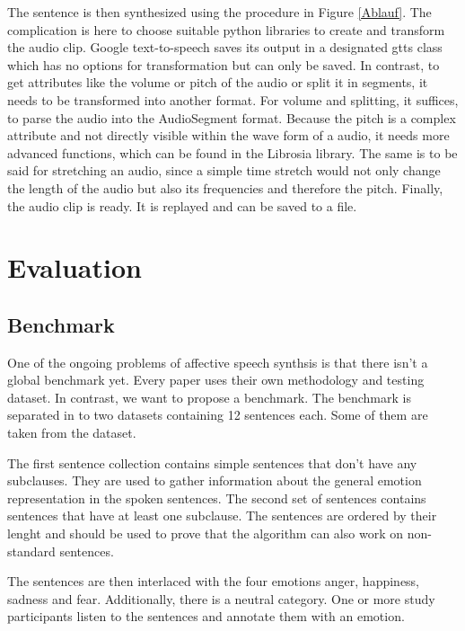 \documentclass[11pt]{article}
\begin{document}
The sentence is then synthesized using the procedure in Figure \ref{Ablauf}. The complication is here to choose suitable python libraries to create and transform the audio clip. Google text-to-speech saves its output in a designated gtts class which has no options for transformation but can only be saved. In contrast, to get attributes like the volume or pitch of the audio or split it in segments, it needs to be transformed into another format. For volume and splitting, it suffices, to parse the audio into the AudioSegment format. Because the pitch is a complex attribute and not directly visible within the wave form of a audio, it needs more advanced functions, which can be found in the Librosia library. The same is to be said for stretching an audio, since a simple time stretch would not only change the length of the audio but also its frequencies and therefore the pitch.
Finally, the audio clip is ready. It is replayed and can be saved to a file.

\section{Evaluation}
\label{evaluation}

\subsection{Benchmark}
One of the ongoing problems of affective speech synthsis is that there isn't a global benchmark yet\cite{triantafyllopoulos_overview_2023}. Every paper uses their own methodology and testing dataset. In contrast, we want to propose a benchmark. The benchmark is separated in to two datasets containing 12 sentences each. Some of them are taken from the \cite{saravia-etal-2018-carer} dataset.

The first sentence collection contains simple sentences that don't have any subclauses. They are used to gather information about the general emotion representation in the spoken sentences. The second set of sentences contains sentences that have at least one subclause. The sentences are ordered by their lenght and should be used to prove that the algorithm can also work on non-standard sentences.

The sentences are then interlaced with the four emotions anger, happiness, sadness and fear. Additionally, there is a neutral category. One or more study participants listen to the sentences and annotate them with an emotion.
\end{document}
